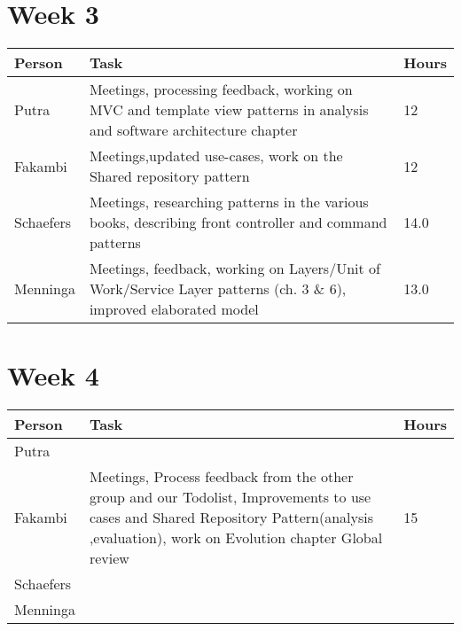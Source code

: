 \section*{Week 3}

\begin{longtable}{p{} p{} p{}}
	\textbf{Person} & \textbf{Task} & \textbf{Hours} \\ \toprule
	Putra           & Meetings, processing feedback, working on MVC and template view patterns in analysis and software architecture chapter & 12 \\ \midrule
	Fakambi         & Meetings,updated use-cases, work on the Shared repository pattern & 12 \\ \midrule
	Schaefers       & Meetings, researching patterns in the various books, describing front controller and command patterns& 14.0 \\ \midrule
	Menninga        & Meetings, feedback, working on Layers/Unit of Work/Service Layer patterns (ch. 3 \& 6), improved elaborated model & 13.0 \\ \bottomrule
\end{longtable}

 \section*{Week 4}
 
\begin{longtable}{p{} p{} p{}}
	\textbf{Person} & \textbf{Task} & \textbf{Hours} \\ \toprule
	Putra           & & \\ \midrule
	Fakambi         & Meetings, Process feedback from the other group and our Todolist, Improvements to use cases and Shared Repository Pattern(analysis ,evaluation), work on Evolution chapter Global review & 15\\ \midrule
	Schaefers       & & \\ \midrule
 	Menninga        & & \\ \bottomrule
 \end{longtable}